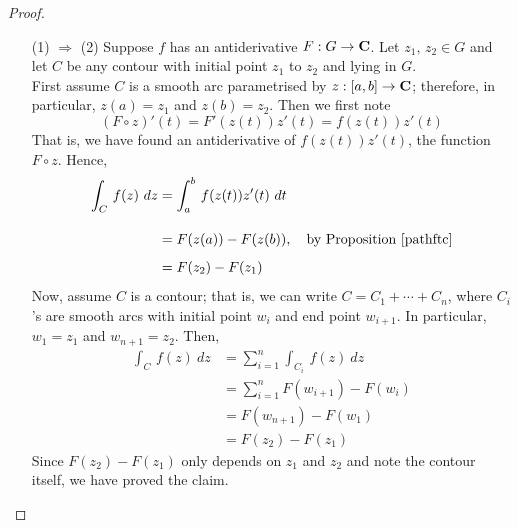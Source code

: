 \begin{proof}\hfill
\begin{itemize}[leftmargin=4.5em,itemsep=1.5em]
\item[(1) $\Rightarrow$ (2)] Suppose $f$ has an antiderivative $F: G \to \mathbf C$. Let $z_1,\,z_2 \in G$ and let $C$ be any contour with initial point $z_1$ to $z_2$ and lying in $G$.\\[0.5em]
First assume $C$ is a smooth arc parametrised by $z:[a,b] \to \mathbf C$; therefore, in particular, $z(a) = z_1$ and $z(b) = z_2$. Then we first note
\[(F\circ z)'(t) = F'(z(t))z'(t) = f(z(t))z'(t)\]
That is, we have found an antiderivative of $f(z(t))z'(t)$, the function $F\circ z$. Hence, 
\begin{align*}
\int_C\,f(z)\ dz &= \int_a^b\,f(z(t))z'(t)\ dt\\[1em]
&= F(z(a)) - F(z(b)),\quad \text{by Proposition \ref{pathftc}}\\[0.5em]
&= F(z_2) - F(z_1)
\end{align*}
Now, assume $C$ is a contour; that is, we can write $C = C_1 + \cdots + C_n$, where $C_i$'s are smooth arcs with initial point $w_i$ and end point $w_{i + 1}$. In particular, $w_1 = z_1$ and $w_{n+1} = z_2$. Then,
\begin{align*}
\int_C\,f(z)\ dz &= \sum_{i=1}^n\int_{C_i}\,f(z)\ dz\\[1em]
 &= \sum_{i=1}^n F(w_{i+1}) - F(w_i)\\[0.5em]
 &= F(w_{n+1}) - F(w_1)\\[0.5em]
 &= F(z_2) - F(z_1)
\end{align*}
Since $F(z_2) - F(z_1)$ only depends on $z_1$ and $z_2$ and note the contour itself, we have proved the claim.


\end{itemize}
\end{proof}
